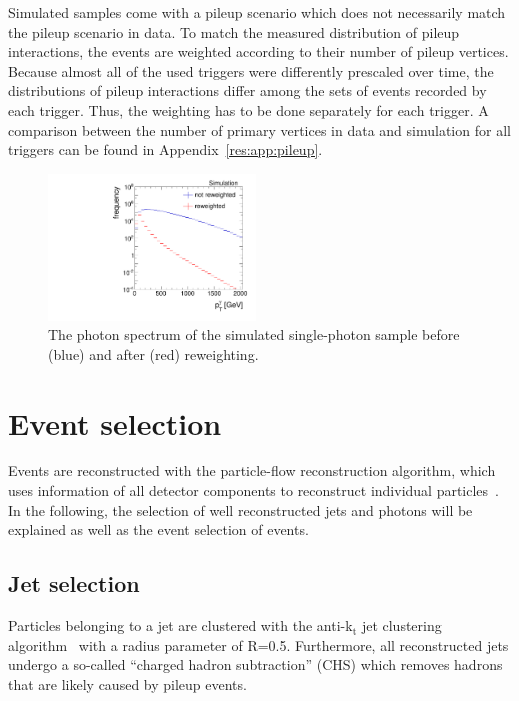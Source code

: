 Simulated samples come with a pileup scenario which does not necessarily match the pileup scenario in data. 
To match the measured distribution of pileup interactions, the events are weighted according to their number of pileup vertices. 
Because almost all of the used triggers were differently prescaled over time, the distributions of pileup interactions differ among the sets of events recorded by each trigger.
Thus, the weighting has to be done separately for each trigger.
A comparison between the number of primary vertices in data and simulation for all triggers can be found in Appendix~\ref{res:app:pileup}.
\begin{figure}[ht]
  \centering
      \includegraphics[width=0.49\textwidth]{figures/resolution/eventSelection/PhotonPtComparison_reweighted.pdf} 
  \caption{The photon \pt spectrum of the \pythiaSix simulated single-photon sample before (blue) and after (red) reweighting.}  
  \label{res:fig:PhotonPtSpectrum}
\end{figure}


\section{Event selection}
\label{res:sec:EventSelection}
Events are reconstructed with the particle-flow reconstruction algorithm, which uses information of all detector components to reconstruct individual particles~\cite{CMS-PAS-PFT-09-001}.
In the following, the selection of well reconstructed jets and photons will be explained as well as the event selection of \GAMJET events.

\subsection*{Jet selection}
Particles belonging to a jet are clustered with the anti-k$_{\text{t}}$ jet clustering algorithm~\cite{bib:JetClustering_2008} with a radius parameter of R=0.5.
Furthermore, all reconstructed jets undergo a so-called ``charged hadron subtraction'' (CHS) which removes hadrons that are likely caused by pileup events.

